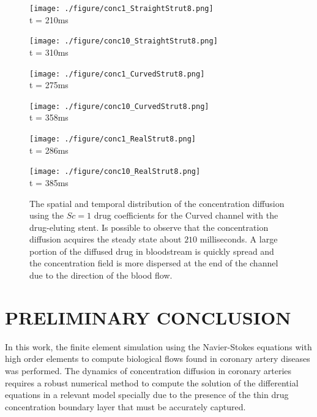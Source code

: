 \documentclass[10pt,fleqn,a4paper,twoside]{article}
\begin{document}
\begin{figure}[H]
\widefigure
     \begin{minipage}{.45\linewidth}
      \centering
      \texttt{[image: ./figure/conc1\_StraightStrut8.png]}\\
      t = 210ms
     \end{minipage}%
     \begin{minipage}{.45\linewidth}
      \centering
      \texttt{[image: ./figure/conc10\_StraightStrut8.png]}\\
      t = 310ms
     \end{minipage}
     \begin{minipage}{.45\linewidth}
     \medskip
      \centering
      \texttt{[image: ./figure/conc1\_CurvedStrut8.png]}\\
      t = 275ms
     \end{minipage}%
     \begin{minipage}{.45\linewidth}
     \medskip
      \centering
      \texttt{[image: ./figure/conc10\_CurvedStrut8.png]}\\
      t = 358ms
     \end{minipage}
     \begin{minipage}{.45\linewidth}
      \centering
      \texttt{[image: ./figure/conc1\_RealStrut8.png]}\\
      t = 286ms
     \end{minipage}%
     \begin{minipage}{.45\linewidth}
      \centering
      \texttt{[image: ./figure/conc10\_RealStrut8.png]}\\
      t = 385ms
     \end{minipage}
     \caption{
The spatial and temporal distribution of the concentration diffusion
using the $Sc=1$ 
drug coefficients for
the Curved channel 
with the drug-eluting stent.
Is possible to observe that
the concentration diffusion acquires the steady state about
$210$ milliseconds. 
A large portion of
the diffused drug in bloodstream is quickly spread and
the concentration field is more dispersed at the end
of the channel due to the direction of the blood flow.
}\label{concentration}
\end{figure}





\section{PRELIMINARY CONCLUSION}
In this work, the finite element simulation using 
the Navier-Stokes equations with high 
order elements to compute biological flows found 
in coronary artery diseases
was performed. The dynamics of concentration 
diffusion in coronary arteries requires a
robust numerical method to compute the solution 
of the differential equations in a relevant
model specially due to the presence of the thin 
drug concentration boundary layer that
must be accurately captured. 
\end{document}
